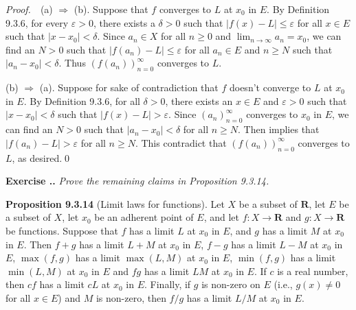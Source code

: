 \documentclass{book}
\newcommand{\pff}{\vspace{.25em}\noindent\emph{Proof.}~~}
\newcommand{\titl}[1]{\noindent\textbf{#1}}
\newcounter{Exercise}[section]
\renewcommand{\theExercise}{\thesection.\arabic{Exercise}.}
\newcommand{\new}{\vspace{1.5em}\noindent\textbf{{Exercise \stepcounter{Exercise}\textbf{\theExercise}}} }
\begin{document}
\pff (a) $\Rightarrow$ (b). Suppose that $f$ converges to $L$ at $x_0$ in $E$. By Definition 9.3.6, for every $\varepsilon>0$, there exists a $\delta>0$ such that $|f(x)-L|\leq\varepsilon$ for all $x\in E$ such that $|x-x_0|<\delta$. Since $a_n\in X$ for all $n\geq 0$ and $\lim_{n\to\infty}a_n=x_0$, we can find an $N>0$ such that $|f(a_n)-L|\leq\varepsilon$ for all $a_n\in E$ and $n\geq N$ such that $|a_n-x_0|<\delta$. Thus $(f(a_n))_{n=0}^{\infty}$ converges to $L$.

(b) $\Rightarrow$ (a). Suppose for sake of contradiction that $f$ doesn't converge to $L$ at $x_0$ in $E$. By Definition 9.3.6, for all $\delta>0$, there exists an $x\in E$ and $\varepsilon>0$ such that $|x-x_0|<\delta$ such that $|f(x)-L|>\varepsilon$. Since $(a_n)_{n=0}^{\infty}$ converges to $x_0$ in $E$, we can find an $N>0$ such that $|a_n-x_0|<\delta$ for all $n\geq N$. Then implies that $|f(a_n)-L|>\varepsilon$ for all $n\geq N$. This contradict that $(f(a_n))_{n=0}^{\infty}$ converges to $L$, as desired.\qed

\begin{comment}
(b) $\Rightarrow$ (a). By Lemma 9.1.14, $x_0$ is an adherent point of $E$. Since $(a_n)_{n=0}^{\infty}$ converges to $x_0$, there exists $\delta>0$ such that $f$ restricted to the set $\{a_n\in E:|a_n-x_0|<\delta\}$ becomes to $\varepsilon$-close to $L$, where $\varepsilon>0$. Thus by Definition 9.3.6, $f$ converges to $L$ at $x_0$ in $E$.
\end{comment}

\new\emph{Prove the remaining claims in Proposition 9.3.14.}

\begin{framed}
\titl{Proposition 9.3.14} (Limit laws for functions). Let $X$ be a subset of $\mathbf{R}$, let $E$ be a subset of $X$, let $x_0$ be an adherent point of $E$, and let $f:X\to\mathbf{R}$ and $g:X\to\mathbf{R}$ be functions. Suppose that $f$ has a limit $L$ at $x_0$ in $E$, and $g$ has a limit $M$ at $x_0$ in $E$. Then $f+g$ has a limit $L+M$ at $x_0$ in $E$, $f-g$ has a limit $L-M$ at $x_0$ in $E$, $\max(f,g)$ has a limit $\max(L,M)$ at $x_0$ in $E$, $\min(f,g)$ has a limit $\min(L,M)$ at $x_0$ in $E$ and $fg$ has a limit $LM$ at $x_0$ in $E$. If $c$ is a real number, then $cf$ has a limit $cL$ at $x_0$ in $E$. Finally, if $g$ is non-zero on $E$ (i.e., $g(x)\neq 0$ for all $x\in E$) and $M$ is non-zero, then $f/g$ has a limit $L/M$ at $x_0$ in $E$.
\end{framed}
\end{document}

